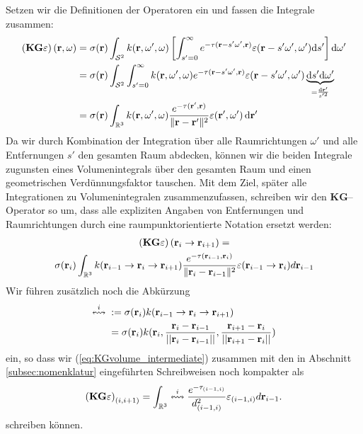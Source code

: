	Setzen wir die Definitionen der Operatoren ein und fassen die Integrale zusammen:
	\begin{align*}
		\left(\mathbf{KG}\varepsilon\right)(\mathbf{r},\omega)&=\sigma(\mathbf{r}) \int_{\mathcal{S}^2} k(\mathbf{r},\omega',\omega)\left[\int_{s'=0}^\infty e^{-\tau(\mathbf{r}-s' \omega',\mathbf{r})}\varepsilon(\mathbf{r}-s' \omega',\omega') \text{d}s'\right] \text{d}\omega' \\
		&=\sigma(\mathbf{r}) \int_{\mathcal{S}^2} \int_{s'=0}^\infty k(\mathbf{r},\omega',\omega) e^{-\tau(\mathbf{r}-s' \omega',\mathbf{r})}\varepsilon(\mathbf{r}-s' \omega',\omega') \underbrace{\text{d}s' \text{d}\omega'}_{=\frac{\text{d}\mathbf{r}'}{s'^2}} \\
		&=\sigma(\mathbf{r}) \int_{\mathbb{R}^3} k(\mathbf{r},\omega',\omega) \frac{e^{-\tau(\mathbf{r}',\mathbf{r})}}{\|\mathbf{r}-\mathbf{r}'\|^2}\varepsilon(\mathbf{r}',\omega') \,\text{d}\mathbf{r}'
	\end{align*}
	Da wir durch Kombination der Integration über alle Raumrichtungen $\omega'$ und alle Entfernungen $s'$ den gesamten Raum abdecken, können wir die beiden Integrale zugunsten eines Volumenintegrals über den gesamten Raum und einen geometrischen Verdünnungsfaktor tauschen. Mit dem Ziel, später alle Integrationen zu Volumenintegralen zusammenzufassen, schreiben wir den $\mathbf{KG}$--Operator so um, dass alle expliziten Angaben von Entfernungen und Raumrichtungen durch eine raumpunktorientierte Notation ersetzt werden:
	\begin{multline}
		\left(\mathbf{KG}\varepsilon\right)(\mathbf{r}_i \rightarrow\mathbf{r}_{i+1})=\\
		\sigma(\mathbf{r}_i) \int_{\mathbb{R}^3} k(\mathbf{r}_{i-1}\rightarrow\mathbf{r}_i\rightarrow\mathbf{r}_{i+1})\frac{e^{-\tau(\mathbf{r}_{i-1},\mathbf{r}_i)}}{\|\mathbf{r}_i-\mathbf{r}_{i-1}\|^2}\varepsilon(\mathbf{r}_{i-1} \rightarrow\mathbf{r}_i)d\mathbf{r}_{i-1}
		\label{eq:KGvolume_intermediate}
	\end{multline}
	Wir führen zusätzlich noch die Abkürzung
	\begin{align*}
		\overset{i}{\leftrightsquigarrow}\;&:=\sigma(\mathbf{r}_i)k(\mathbf{r}_{i-1}\rightarrow\mathbf{r}_i\rightarrow\mathbf{r}_{i+1})\\
			&=\sigma(\mathbf{r}_i)k(\mathbf{r}_i,\frac{\mathbf{r}_i-\mathbf{r}_{i-1}}{||\mathbf{r}_i-\mathbf{r}_{i-1}||},\frac{\mathbf{r}_{i+1}-\mathbf{r}_i}{||\mathbf{r}_{i+1}-\mathbf{r}_i||})
	\end{align*}
	ein, so dass wir (\ref{eq:KGvolume_intermediate}) zusammen mit den in Abschnitt \ref{subsec:nomenklatur} eingeführten Schreibweisen noch kompakter als
	\begin{equation}
		\left(\mathbf{KG}\varepsilon\right)_{(i,i+1)}=\int_{\mathbb{R}^3} \overset{i}{\leftrightsquigarrow}\frac{e^{-\tau_{(i-1,i)}}}{d_{(i-1,i)}^2}\varepsilon_{(i-1,i)}d\mathbf{r}_{i-1}.
		\label{eq:KGvolume}
	\end{equation}
	schreiben können.


